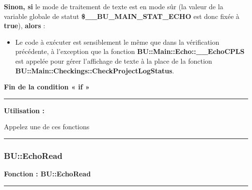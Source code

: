 \documentclass[a4paper,10pt]{article}
\begin{document}
\setlength{\parskip}{1em}

\begin{justify}
    \textbf{\color{cond}Sinon, si} le mode de traitement de texte est en mode sûr (la valeur de la variable globale de statut \textbf{\color{vars}\$\_\_BU\_MAIN\_STAT\_ECHO} est donc fixée à \textbf{true}), \textbf{\color{cond}alors} :

    \begin{itemize}
        \item
        {
            \begin{justify}
                Le code à exécuter est sensiblement le même que dans la vérification précédente, à l'exception que la fonction \textbf{\color{func}BU::Main::Echo::\_\_EchoCPLS} est appelée pour gérer l'affichage de texte à la place de la fonction \textbf{\color{func}BU::Main::Checkings::CheckProjectLogStatus}.
            \end{justify}
        }
    \end{itemize}
\end{justify}

\begin{justify}
    \textbf{\color{cond}Fin de la condition « if »}
\end{justify}


\par\noindent\rule{\textwidth}{0.4pt}

\begin{justify}
    \textbf{Utilisation :}

    Appelez une de ces fonctions 
\end{justify}



\color{sec3}\par\noindent\rule{\textwidth}{0.4pt}\color{text}

\color{sec3}
\subsubsection{BU::EchoRead}\color{text}

\begin{justify}
    \textbf{Fonction : \color{func}BU::EchoRead}
\end{justify}


\par\noindent\rule{\textwidth}{0.4pt}
\end{document}
